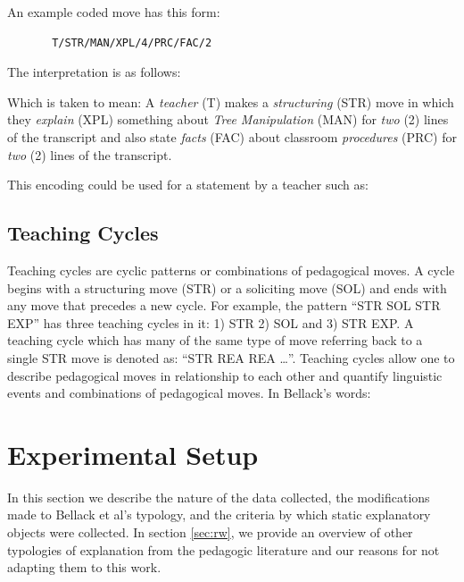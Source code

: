 \documentclass[conference]{IEEEtran}
\begin{document}
An example coded move has this form:
\begin{verbatim}
       T/STR/MAN/XPL/4/PRC/FAC/2
\end{verbatim}

The interpretation is as follows:

Which is taken to mean: A \emph{teacher} (T) makes a \emph{structuring} (STR) move
in which they \emph{explain} (XPL) something about \emph{Tree Manipulation} (MAN) for
\emph{two} (2) lines of the transcript and also state \emph{facts} (FAC) about
classroom \emph{procedures} (PRC) for \emph{two} (2) lines of the transcript.

This encoding could be used for a statement by a teacher such as:


\subsection{Teaching Cycles}
Teaching cycles are cyclic patterns or combinations of pedagogical moves. A
cycle begins with a structuring move (STR) or a soliciting move (SOL) and ends
with any move that precedes a new cycle. For example, the pattern ``STR SOL STR
EXP'' has three teaching cycles in it: 1) STR 2) SOL and 3) STR EXP. A teaching
cycle which has many of the same type of move referring back to a single STR
move is denoted as: ``STR REA REA \ldots''. Teaching cycles allow one to
describe pedagogical moves in relationship to each other and quantify linguistic
events and combinations of pedagogical moves. In Bellack's words:



\section{Experimental Setup}
In this section we describe the nature of the data collected, the modifications
made to Bellack et al's typology, and the criteria by which static explanatory
objects were collected. In section \ref{sec:rw}, we provide an overview of other
typologies of explanation from the pedagogic literature and our reasons for not
adapting them to this work. 
\end{document}
